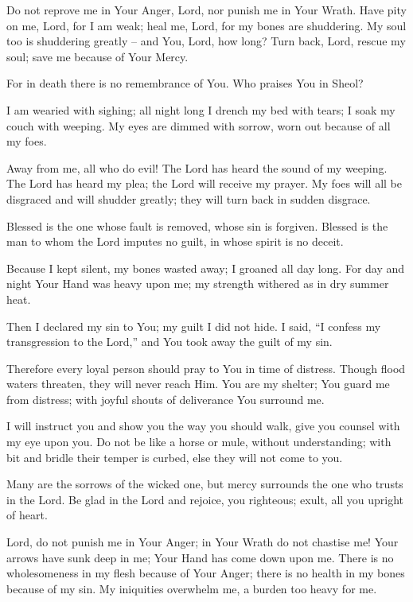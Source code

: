 Do not reprove me in Your Anger, Lord,
nor punish me in Your Wrath.
Have pity on me, Lord, for I am weak;
heal me, Lord, for my bones are shuddering.
My soul too is shuddering greatly -- and You, Lord, how long?
Turn back, Lord, rescue my soul;
save me because of Your Mercy.

For in death there is no remembrance of You.
Who praises You in Sheol?

I am wearied with sighing;
all night long I drench my bed with tears;
I soak my couch with weeping.
My eyes are dimmed with sorrow, worn out because of all my foes.

Away from me, all who do evil!
The Lord has heard the sound of my weeping.
The Lord has heard my plea;
the Lord will receive my prayer.
My foes will all be disgraced and will shudder greatly;
they will turn back in sudden disgrace.

Blessed is the one whose fault is removed, whose sin is forgiven.
Blessed is the man to whom the Lord imputes no guilt, in whose spirit is no deceit.

Because I kept silent, my bones wasted away;
I groaned all day long.
For day and night Your Hand was heavy upon me;
my strength withered as in dry summer heat.

Then I declared my sin to You;
my guilt I did not hide.
I said, ``I confess my transgression to the Lord,'' and You took away the guilt of my sin.

Therefore every loyal person should pray to You in time of distress.
Though flood waters threaten, they will never reach Him.
You are my shelter; You guard me from distress;
with joyful shouts of deliverance You surround me.

I will instruct you and show you the way you should walk, give you counsel with my eye upon you.
Do not be like a horse or mule, without understanding;
with bit and bridle their temper is curbed, else they will not come to you.

Many are the sorrows of the wicked one, but mercy surrounds the one who trusts in the Lord.
Be glad in the Lord and rejoice, you righteous;
exult, all you upright of heart.

Lord, do not punish me in Your Anger;
in Your Wrath do not chastise me!
Your arrows have sunk deep in me;
Your Hand has come down upon me.
There is no wholesomeness in my flesh because of Your Anger;
there is no health in my bones because of my sin.
My iniquities overwhelm me, a burden too heavy for me.


